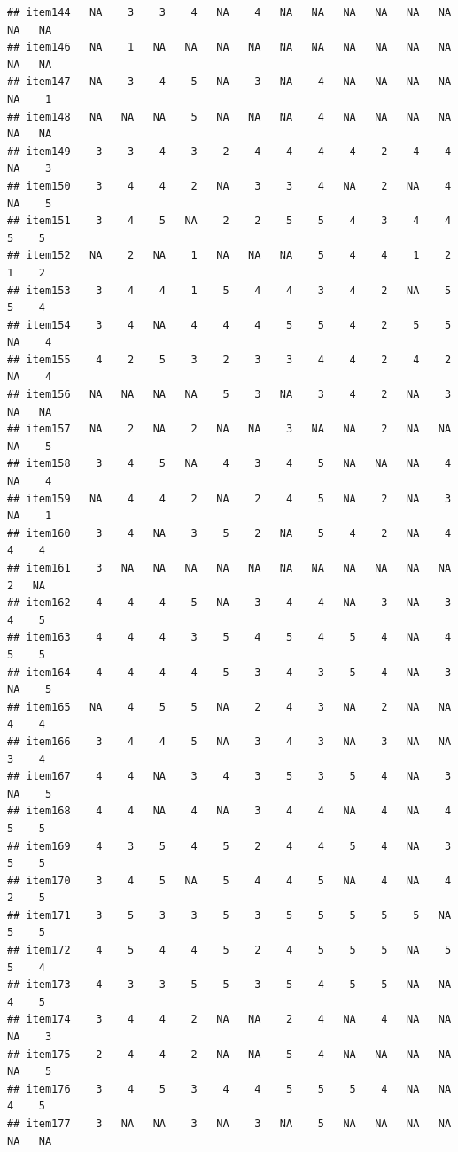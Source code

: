 \documentclass[
  man]{apa6}
\begin{document}
\begin{verbatim}
## item144   NA    3    3    4   NA    4   NA   NA   NA   NA   NA   NA   NA   NA
## item146   NA    1   NA   NA   NA   NA   NA   NA   NA   NA   NA   NA   NA   NA
## item147   NA    3    4    5   NA    3   NA    4   NA   NA   NA   NA   NA    1
## item148   NA   NA   NA    5   NA   NA   NA    4   NA   NA   NA   NA   NA   NA
## item149    3    3    4    3    2    4    4    4    4    2    4    4   NA    3
## item150    3    4    4    2   NA    3    3    4   NA    2   NA    4   NA    5
## item151    3    4    5   NA    2    2    5    5    4    3    4    4    5    5
## item152   NA    2   NA    1   NA   NA   NA    5    4    4    1    2    1    2
## item153    3    4    4    1    5    4    4    3    4    2   NA    5    5    4
## item154    3    4   NA    4    4    4    5    5    4    2    5    5   NA    4
## item155    4    2    5    3    2    3    3    4    4    2    4    2   NA    4
## item156   NA   NA   NA   NA    5    3   NA    3    4    2   NA    3   NA   NA
## item157   NA    2   NA    2   NA   NA    3   NA   NA    2   NA   NA   NA    5
## item158    3    4    5   NA    4    3    4    5   NA   NA   NA    4   NA    4
## item159   NA    4    4    2   NA    2    4    5   NA    2   NA    3   NA    1
## item160    3    4   NA    3    5    2   NA    5    4    2   NA    4    4    4
## item161    3   NA   NA   NA   NA   NA   NA   NA   NA   NA   NA   NA    2   NA
## item162    4    4    4    5   NA    3    4    4   NA    3   NA    3    4    5
## item163    4    4    4    3    5    4    5    4    5    4   NA    4    5    5
## item164    4    4    4    4    5    3    4    3    5    4   NA    3   NA    5
## item165   NA    4    5    5   NA    2    4    3   NA    2   NA   NA    4    4
## item166    3    4    4    5   NA    3    4    3   NA    3   NA   NA    3    4
## item167    4    4   NA    3    4    3    5    3    5    4   NA    3   NA    5
## item168    4    4   NA    4   NA    3    4    4   NA    4   NA    4    5    5
## item169    4    3    5    4    5    2    4    4    5    4   NA    3    5    5
## item170    3    4    5   NA    5    4    4    5   NA    4   NA    4    2    5
## item171    3    5    3    3    5    3    5    5    5    5    5   NA    5    5
## item172    4    5    4    4    5    2    4    5    5    5   NA    5    5    4
## item173    4    3    3    5    5    3    5    4    5    5   NA   NA    4    5
## item174    3    4    4    2   NA   NA    2    4   NA    4   NA   NA   NA    3
## item175    2    4    4    2   NA   NA    5    4   NA   NA   NA   NA   NA    5
## item176    3    4    5    3    4    4    5    5    5    4   NA   NA    4    5
## item177    3   NA   NA    3   NA    3   NA    5   NA   NA   NA   NA   NA   NA

\end{verbatim}
\end{document}
